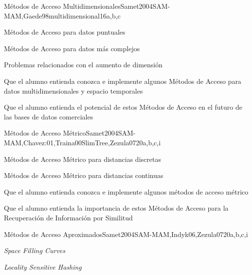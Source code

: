 \begin{syllabus}
\begin{unit}{Métodos de Acceso Multidimensionales}{}{Samet2004SAM-MAM,Gaede98multidimensional}{16}{a,b,c}
   \begin{topics}
         \item Métodos de Acceso para datos puntuales
         \item Métodos de Acceso para datos más complejos
         \item Problemas relacionados con el aumento de dimensión
   \end{topics}

   \begin{learningoutcomes}
         \item Que el alumno entienda conozca e implemente algunos Métodos de Acceso para datos multidimensionales y espacio temporales
         \item Que el alumno entienda el potencial de estos Métodos de Acceso en el futuro de las bases de datos comerciales
   \end{learningoutcomes}
\end{unit}

\begin{unit}{Métodos de Acceso Métrico}{}{Samet2004SAM-MAM,Chavez:01,Traina00SlimTree,Zezula07}{20}{a,b,c,i}
   \begin{topics}
         \item Métodos de Acceso Métrico para distancias discretas
         \item Métodos de Acceso Métrico para distancias continuas
   \end{topics}

   \begin{learningoutcomes}
         \item Que el alumno entienda conozca e implemente algunos métodos de acceso métrico
         \item Que el alumno entienda la importancia de estos Métodos de Acceso para la Recuperación de Información por Similitud
   \end{learningoutcomes}
\end{unit}

\begin{unit}{Métodos de Acceso Aproximados}{}{Samet2004SAM-MAM,Indyk06,Zezula07}{20}{a,b,c,i}
   \begin{topics}
         \item \textit{Space Filling Curves}
         \item \textit{Locality Sensitive Hashing}
   \end{topics}


\end{unit}
\end{syllabus}
